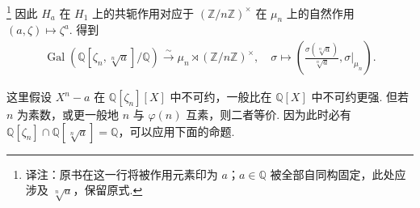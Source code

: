 \footnote{译注：原书在这一行将被作用元素印为 $a$；$a\in\mathbb Q$ 被全部自同构固定，此处应涉及 $\sqrt[n]a$，保留原式.}
因此 $H_a$ 在 $H_1$ 上的共轭作用对应于 $(\mathbb Z/n\mathbb Z)^\times$ 在 $\mu_n$ 上的自然作用 $(a,\zeta)\mapsto\zeta^a$. 得到
\begin{align*}\operatorname{Gal}(\mathbb Q[\zeta_n,\sqrt[n]a]/\mathbb Q)\xrightarrow{\sim}\mu_n\rtimes(\mathbb Z/n\mathbb Z)^\times,\quad\sigma\mapsto\left(\frac{\sigma(\sqrt[n]a)}{\sqrt[n]a},\sigma|_{\mu_n}\right).\end{align*}
\begin{remark*}这里假设 $X^n-a$ 在 $\mathbb Q[\zeta_n][X]$ 中不可约，一般比在 $\mathbb Q[X]$ 中不可约更强. 但若 $n$ 为素数，或更一般地 $n$ 与 $\varphi(n)$ 互素，则二者等价. 因为此时必有 $\mathbb Q[\zeta_n]\cap\mathbb Q[\sqrt[n]a]=\mathbb Q$，可以应用下面的命题.\end{remark*}
